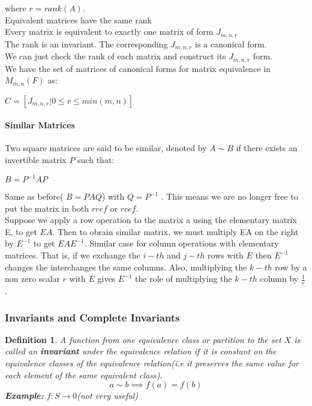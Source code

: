 \documentclass [12pt]{article}
\newtheorem {definition}{Definition}
\begin{document}
where $r=rank(A)$.\\

Equivalent matrices have the same rank\\

Every matrix is equivalent to exactly one matrix of form $J_{m,n,r}$\\

The rank is an invariant. The corresponding $J_{m,n,r}$ is a canonical form.\\

We can just check the rank of each matrix and construct its $J_{m,n,r}$
form.\\

We have the set of matrices of canonical forms for matrix equivalence in
$M_{m,n}(F)$ as: 

\(C=[J_{m,n,r}|0\leq r\leq min(m,n)]\) 


\paragraph {Similar Matrices} 

Two square matrices are said to be similar, denoted by $A\sim B$ if there
exists an invertible matrix $P$ such that: 

\(B=P^{-1}AP\) 

Same as before( $B=PAQ$) with $Q=P^{-1}$ . This means we are no longer free
to put the matrix in both $rref$ or $rcef$.\\
\color {blue} Suppose we apply a row operation to the matrix a using the
elementary matrix E, to get $EA$. Then to obrain similar matrix, we must
multiply EA on the right by $E^{-1}$ to get $EAE^{-1}$. Similar case for
column operations with elementary matrices. That is, if we exchange the
$i-th$ and $j-th$ rows with $E$ then $E^{-1}$ changes the interchanges the
same columns. Also, multiplying the $k-th$ row by a non zero scalar $r$
with $E$ gives $E^{-1}$ the role of multiplying the $k-th$ column by $\frac{1}{r}$.
\color {black} 


\subsubsection {Invariants and Complete Invariants} 

\begin {definition}
 A function from one equivalence class or partition to the set $X$ is called
an \textbf{invariant} under the equivalence relation if it is constant on
the equivalence classes of the equivalence relation(i.e it preserves the
same value for each element of the same equivalent class).\\
\[a\sim b\implies f(a)=f(b) \]
 \textbf{Example:} $f:S\rightarrow 0$(not very useful) 
\end {definition}
 
\end{document}
